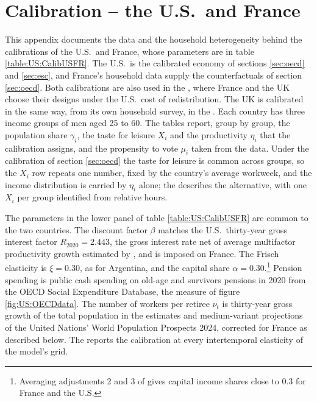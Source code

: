 \FloatBarrier
\section{Calibration -- the U.S.\ and France}\label{app:US}\setcounter{equation}{0}
This appendix documents the data and the household heterogeneity behind the calibrations of the U.S.\ and France, whose parameters are in table \ref{table:US:CalibUSFR}. The U.S.\ is the calibrated economy of sections \ref{sec:oecd} and \ref{sec:esc}, and France's household data supply the counterfactuals of section \ref{sec:oecd}. Both calibrations are also used in the , where France and the UK choose their designs under the U.S.\ cost of redistribution. The UK is calibrated in the same way, from its own household survey, in the . Each country has three income groups of men aged 25 to 60. The tables report, group by group, the population share $\gamma_i$, the taste for leisure $X_i$ and the productivity $\eta_i$ that the calibration assigns, and the propensity to vote $\mu_i$ taken from the data. Under the calibration of section \ref{sec:oecd} the taste for leisure is common across groups, so the $X_i$ row repeats one number, fixed by the country's average workweek, and the income distribution is carried by $\eta_i$ alone; the  describes the alternative, with one $X_i$ per group identified from relative hours.

The parameters in the lower panel of table \ref{table:US:CalibUSFR} are common to the two countries. The discount factor $\beta$ matches the U.S.\ thirty-year gross interest factor $R_{2020} = 2.443$, the gross interest rate net of average multifactor productivity growth estimated by \textcite{mkvss08}, and is imposed on France. The Frisch elasticity is $\xi = 0.30$, as for Argentina, and the capital share $\alpha = 0.30$.\footnote{Averaging adjustments 2 and 3 of \textcite{Gollina1} gives capital income shares close to 0.3 for France and the U.S.} Pension spending is public cash spending on old-age and survivors pensions in 2020 from the OECD Social Expenditure Database, the measure of figure \ref{fig:US:OECDdata}. The number of workers per retiree $\nu_t$ is thirty-year gross growth of the total population in the estimates and medium-variant projections of the United Nations' World Population Prospects 2024, corrected for France as described below. The  reports the calibration at every intertemporal elasticity of the model's grid.

